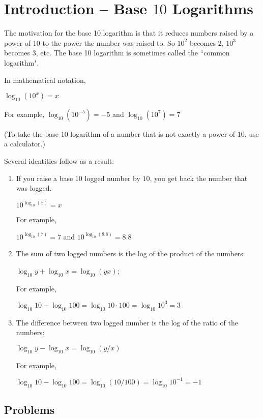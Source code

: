 \documentclass{article}
\begin{document}
\section{Introduction -- Base $10$ Logarithms}

The motivation for the base 10 logarithm is that it reduces numbers raised by a power of 10 to the power the number was raised to. So $10^2$ becomes $2$, $10^3$ becomes $3$, etc. The base 10 logarithm is sometimes called the ``common logarithm".

In mathematical notation,

$\log_{10}(10^x) = x$

For example, $\log_{10}(10^{-5}) = -5$ and $\log_{10}(10^7) = 7$

(To take the base 10 logarithm of a number that is not exactly a power of $10$, use a calculator.)

Several identities follow as a result:

\begin{enumerate}

  \item If you raise a base 10 logged number by $10$, you get back the number that was logged.

        $10^{\log_{10}(x)} = x$

        For example,

        $10^{\log_{10}(7)} = 7$ and  $10^{\log_{10}(8.8)} = 8.8$

  \item The sum of two logged numbers is the log of the product of the numbers:

        $\log_{10}y + \log_{10}x = \log_{10}(yx)$;

        For example,

        $\log_{10}10 + \log_{10}100 = \log_{10}10\cdot 100 = \log_{10}10^3 = 3$

  \item The difference between two logged number is the log of the ratio of the numbers:

        $\log_{10}y - \log_{10}x = \log_{10}(y/x)$

        For example,

        $\log_{10}10 - \log_{10}100 = \log_{10}(10/100) = \log_{10}10^{-1} = -1$

\end{enumerate}

\subsection{Problems}
\end{document}
